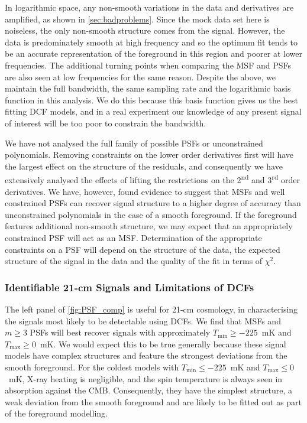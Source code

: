 In logarithmic space, any non-smooth variations in the data and derivatives are amplified, as shown in \cref{sec:badproblems}. Since the mock data set here is noiseless, the only non-smooth structure comes from the signal. However, the data is predominately smooth at high frequency and so the optimum fit tends to be an accurate representation of the foreground in this region and poorer at lower frequencies. The additional turning points when comparing the MSF and PSFs are also seen at low frequencies for the same reason. Despite the above, we maintain the full bandwidth, the same sampling rate and the logarithmic basis function in this analysis. We do this because this basis function gives us the best fitting DCF models, and in a real experiment our knowledge of any present signal of interest will be too poor to constrain the bandwidth.

We have not analysed the full family of possible PSFs or unconstrained polynomials. Removing constraints on the lower order derivatives first will have the largest effect on the structure of the residuals, and consequently we have extensively analysed the effects of lifting the restrictions on the 2\textsuperscript{nd} and 3\textsuperscript{rd} order derivatives. We have, however, found evidence to suggest that MSFs and well constrained PSFs can recover signal structure to a higher degree of accuracy than unconstrained polynomials in the case of a smooth foreground. If the foreground features additional non-smooth structure, we may expect that an appropriately constrained PSF will act as an MSF. Determination of the appropriate constraints on a PSF will depend on the structure of the data, the expected structure of the signal in the data and the quality of the fit in terms of $\chi^2$.

\subsubsection{Identifiable 21-cm Signals and Limitations of DCFs}

The left panel of \cref{fig:PSF_comp} is useful for 21-cm cosmology, in characterising the signals most likely to be detectable using DCFs. We find that MSFs and $m \geq 3$ PSFs will best recover signals with approximately $T_\mathrm{min} \geq -225$~mK and $T_\mathrm{max} \geq 0$~mK. We would expect this to be true generally because these signal models have complex structures and feature the strongest deviations from the smooth foreground. For the coldest models with $T_\mathrm{min} \leq -225$~mK and $T_\mathrm{max} \leq 0$~mK, X-ray heating is negligible, and the spin temperature is always seen in absorption against the CMB. Consequently, they have the simplest structure, a weak deviation from the smooth foreground and are likely to be fitted out as part of the foreground modelling.


